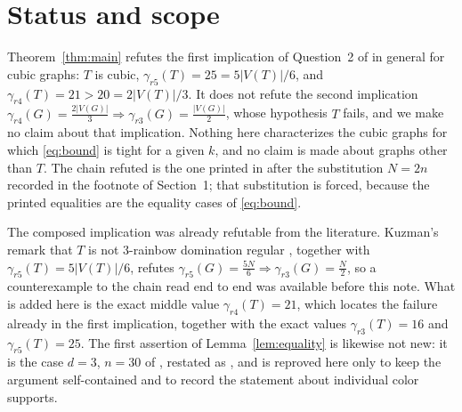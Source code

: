 \documentclass[11pt]{amsart}
\begin{document}
\section*{Status and scope}

Theorem~\ref{thm:main} refutes the first implication of Question~2 of
\cite{Zerovnik2024} in general for cubic graphs: $T$ is cubic,
$\gamma_{r5}(T)=25=5|V(T)|/6$, and $\gamma_{r4}(T)=21>20=2|V(T)|/3$. It
does not refute the second implication
$\gamma_{r4}(G)=\frac{2|V(G)|}{3}\Rightarrow
\gamma_{r3}(G)=\frac{|V(G)|}{2}$, whose hypothesis $T$ fails, and we make
no claim about that implication. Nothing here characterizes the cubic
graphs for which \eqref{eq:bound} is tight for a given $k$, and no claim
is made about graphs other than $T$. The chain refuted is the one printed
in \cite[Question~2]{Zerovnik2024} after the substitution $N=2n$
recorded in the footnote of Section~1; that substitution is forced,
because the printed equalities are the equality cases of
\eqref{eq:bound}.

The composed implication was already refutable from the literature.
Kuzman's remark that $T$ is not $3$-rainbow domination regular
\cite[Question~(Q6), p.~37]{Kuzman2025}, together with
$\gamma_{r5}(T)=5|V(T)|/6$, refutes
$\gamma_{r5}(G)=\frac{5N}{6}\Rightarrow\gamma_{r3}(G)=\frac{N}{2}$, so a
counterexample to the chain read end to end was available before this
note. What is added here is the exact middle value $\gamma_{r4}(T)=21$,
which locates the failure already in the first implication, together
with the exact values $\gamma_{r3}(T)=16$ and $\gamma_{r5}(T)=25$. The
first assertion of Lemma~\ref{lem:equality} is likewise not new: it is
the case $d=3$, $n=30$ of \cite[Theorem~3.1]{Kuzman2020}, restated as
\cite[Theorem~2.1(ii)]{Kuzman2025}, and is reproved here only to keep
the argument self-contained and to record the statement about individual
color supports.
\end{document}
